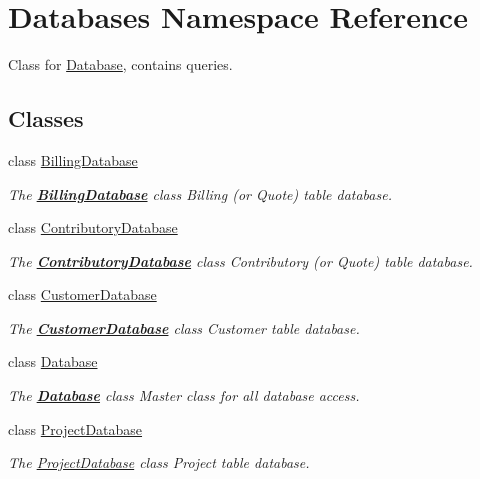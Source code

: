 \hypertarget{namespaceDatabases}{\section{Databases Namespace Reference}
\label{namespaceDatabases}
}


Class for \hyperlink{classDatabases_1_1Database}{Database}, contains queries.  


\subsection*{Classes}
\begin{DoxyCompactItemize}
\item 
class \hyperlink{classDatabases_1_1BillingDatabase}{Billing\-Database}
\begin{DoxyCompactList}\small\item\em The {\bfseries \hyperlink{classDatabases_1_1BillingDatabase}{Billing\-Database}} class Billing (or Quote) table database. \end{DoxyCompactList}\item 
class \hyperlink{classDatabases_1_1ContributoryDatabase}{Contributory\-Database}
\begin{DoxyCompactList}\small\item\em The {\bfseries \hyperlink{classDatabases_1_1ContributoryDatabase}{Contributory\-Database}} class Contributory (or Quote) table database. \end{DoxyCompactList}\item 
class \hyperlink{classDatabases_1_1CustomerDatabase}{Customer\-Database}
\begin{DoxyCompactList}\small\item\em The {\bfseries \hyperlink{classDatabases_1_1CustomerDatabase}{Customer\-Database}} class Customer table database. \end{DoxyCompactList}\item 
class \hyperlink{classDatabases_1_1Database}{Database}
\begin{DoxyCompactList}\small\item\em The {\bfseries \hyperlink{classDatabases_1_1Database}{Database}} class Master class for all database access. \end{DoxyCompactList}\item 
class \hyperlink{classDatabases_1_1ProjectDatabase}{Project\-Database}
\begin{DoxyCompactList}\small\item\em The \hyperlink{classDatabases_1_1ProjectDatabase}{Project\-Database} class Project table database. \end{DoxyCompactList}\item 

\end{DoxyCompactItemize}
